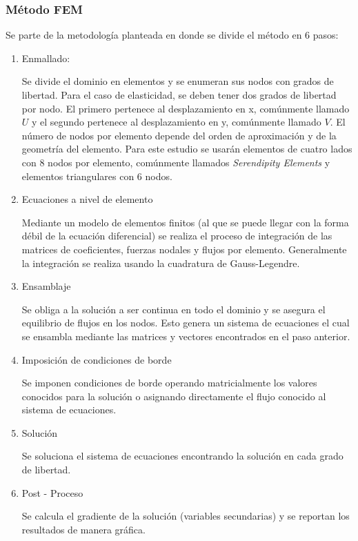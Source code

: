 		\subsubsection{Método FEM}
		Se parte de la metodología planteada en \textcite{Reddy} donde se divide el método en 6 pasos:
			\begin{enumerate}
				\item Enmallado:

				Se divide el dominio en elementos y se enumeran sus nodos con grados de libertad. Para el caso de elasticidad, se deben tener dos grados de libertad por nodo. El primero pertenece al desplazamiento en x, comúnmente llamado $U$ y el segundo pertenece al desplazamiento en y, comúnmente llamado $V$. El número de nodos por elemento depende del orden de aproximación y de la geometría del elemento. Para este estudio se usarán elementos de cuatro lados con 8 nodos por elemento, comúnmente llamados \textit{Serendipity Elements} y elementos triangulares con 6 nodos.
				\item Ecuaciones a nivel de elemento

				Mediante un modelo de elementos finitos (al que se puede llegar con la forma débil de la ecuación diferencial) se realiza el proceso de integración de las matrices de coeficientes, fuerzas nodales y flujos por elemento. Generalmente la integración se realiza usando la cuadratura de Gauss-Legendre.
				\item Ensamblaje

				Se obliga a la solución a ser continua en todo el dominio y se asegura el equilibrio de flujos en los nodos. Esto genera un sistema de ecuaciones el cual se ensambla mediante las matrices y vectores encontrados en el paso anterior. 
				\item Imposición de condiciones de borde

				Se imponen condiciones de borde operando matricialmente los valores conocidos para la solución o asignando directamente el flujo conocido al sistema de ecuaciones. 
				\item Solución

				Se soluciona el sistema de ecuaciones encontrando la solución en cada grado de libertad.
				\item Post - Proceso

				Se calcula el gradiente de la solución (variables secundarias) y se reportan los resultados de manera gráfica.

			\end{enumerate}
